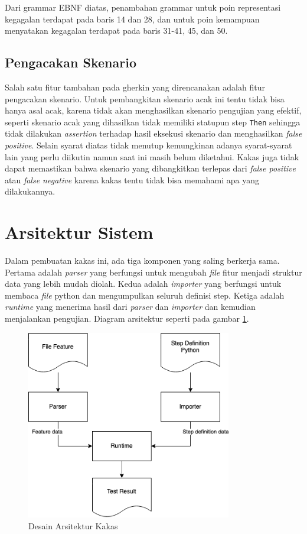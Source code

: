 Dari grammar EBNF diatas, penambahan grammar untuk poin representasi kegagalan terdapat pada baris 14 dan 28,
dan untuk poin kemampuan menyatakan kegagalan terdapat pada baris 31-41, 45, dan 50.

\subsection{Pengacakan Skenario}

Salah satu fitur tambahan pada gherkin yang direncanakan adalah fitur pengacakan skenario.
Untuk pembangkitan skenario acak ini tentu tidak bisa hanya asal acak, karena tidak akan menghasilkan
skenario pengujian yang efektif, seperti skenario acak yang dihasilkan tidak memiliki statupun step \texttt{Then}
sehingga tidak dilakukan \textit{assertion} terhadap hasil eksekusi skenario dan menghasilkan \textit{false positive}.
Selain syarat diatas tidak menutup kemungkinan adanya syarat-syarat lain yang perlu diikutin namun saat ini masih belum
diketahui.
Kakas juga tidak dapat memastikan bahwa skenario yang dibangkitkan terlepas dari \textit{false positive} atau
\textit{false negative} karena kakas tentu tidak bisa memahami apa yang dilakukannya.

\section{Arsitektur Sistem}

Dalam pembuatan kakas ini, ada tiga komponen yang saling berkerja sama. Pertama adalah \emph{parser} yang
berfungsi untuk mengubah \emph{file} fitur menjadi struktur data yang lebih mudah diolah. Kedua adalah
\emph{importer} yang berfungsi untuk membaca \emph{file} python dan mengumpulkan seluruh definisi step.
Ketiga adalah \emph{runtime} yang menerima hasil dari \emph{parser} dan \emph{importer} dan kemudian
menjalankan pengujian. Diagram arsitektur seperti pada gambar \ref{dia:desain-arsitektur}.

\begin{figure}[h]
  \centering
  \includegraphics[width=0.8\textwidth]{resources/desain-arsitektur.png}
  \caption{Desain Arsitektur Kakas}
  \label{dia:desain-arsitektur}
\end{figure}


